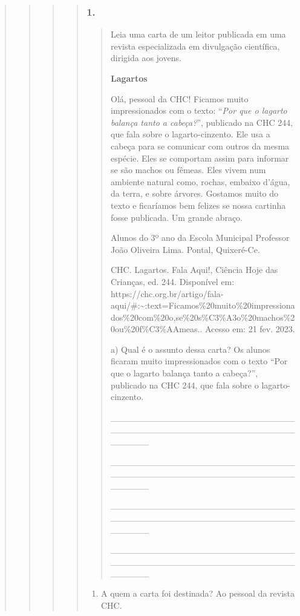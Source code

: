 \begin{quote}
\begin{quote}
\begin{quote}
\begin{quote}
\subsubsection{1. }\label{section-57}

\begin{quote}
Leia uma carta de um leitor publicada em uma revista especializada em
divulgação científica, dirigida aos jovens.

\textbf{Lagartos}

Olá, pessoal da CHC! \protect\hypertarget{_Hlk127887653}{}{}Ficamos
muito impressionados com o texto: ``\emph{Por que o lagarto balança
tanto a cabeça?}'', publicado na CHC 244, que fala sobre o
lagarto-cinzento. Ele usa a cabeça para se comunicar com outros da mesma
espécie. Eles se comportam assim para informar se são machos ou fêmeas.
Eles vivem num ambiente natural como, rochas, embaixo d'água, da terra,
e sobre árvores. Gostamos muito do texto e ficaríamos bem felizes se
nossa cartinha fosse publicada. Um grande abraço.

Alunos do 3º ano da Escola Municipal Professor João Oliveira Lima.
Pontal, Quixeré-Ce.

CHC. Lagartos. Fala Aqui!, Ciência Hoje das Crianças, ed. 244.
Disponível em:
https://chc.org.br/artigo/fala-aqui/\#:\textasciitilde{}:text=Ficamos\%20muito\%20impressionados\%20com\%20o,se\%20s\%C3\%A3o\%20machos\%20ou\%20f\%C3\%AAmeas..
Acesso em: 21 fev. 2023.

a) Qual é o assunto dessa carta? Os alunos ficaram muito impressionados
com o texto ``Por que o lagarto balança tanto a cabeça?'', publicado na
CHC 244, que fala sobre o lagarto-cinzento.

\protect\hypertarget{_Hlk127887290}{}{}\_\_\_\_\_\_\_\_\_\_\_\_\_\_\_\_\_\_\_\_\_\_\_\_\_\_\_\_\_\_\_\_\_\_\_\_\_\_\_\_\_\_\_\_\_\_\_\_\_\_\_\_\_\_\_\_\_\_\_\_\_\_\_\_

\_\_\_\_\_\_\_\_\_\_\_\_\_\_\_\_\_\_\_\_\_\_\_\_\_\_\_\_\_\_\_\_\_\_\_\_\_\_\_\_\_\_\_\_\_\_\_\_\_\_\_\_\_\_\_\_\_\_\_\_\_\_\_\_

\_\_\_\_\_\_\_\_\_\_\_\_\_\_\_\_\_\_\_\_\_\_\_\_\_\_\_\_\_\_\_\_\_\_\_\_\_\_\_\_\_\_\_\_\_\_\_\_\_\_\_\_\_\_\_\_\_\_\_\_\_\_\_\_

\_\_\_\_\_\_\_\_\_\_\_\_\_\_\_\_\_\_\_\_\_\_\_\_\_\_\_\_\_\_\_\_\_\_\_\_\_\_\_\_\_\_\_\_\_\_\_\_\_\_\_\_\_\_\_\_\_\_\_\_\_\_\_\_
\end{quote}

\begin{enumerate}
\def\labelenumi{\alph{enumi})}
\item
  A quem a carta foi destinada? Ao pessoal da revista CHC.
\end{enumerate}


\end{quote}
\end{quote}
\end{quote}
\end{quote}

